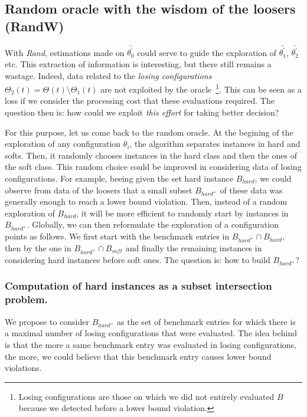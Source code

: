 \documentclass[10pt, conference, compsocconf]{IEEEtran}
\begin{document}
\subsection{Random  oracle with the wisdom of the loosers (RandW)}

With {\it Rand}, estimations made on  $\bar{\theta^{'}_0}$ could serve 
to guide the exploration of $\bar{\theta^{'}_{1}}$, $\bar{\theta^{'}_{2}}$ etc. This extraction of information is 
interesting, but there still remains a wastage. Indeed, data related to the {\it losing configurations} 
$\Theta_2(t) = \Theta(t) \setminus \Theta_1(t)$ are not exploited by the oracle~\footnote{Losing configurations 
are those on which we did not entirely evaluated $B$ because we detected before a lower bound violation.}. 
This can be seen as a loss if we consider the processing cost that these evaluations required. The question then 
is: how could we exploit {\it this effort} for taking better decision? 

For this purpose, let us come back to the random  oracle. At the begining of the exploration of any 
configuration $\theta_i$, the algorithm separates instances in hard and softs. Then, it randomly chooses  
instances in the hard class and then the ones of the soft class. This random choice could be improved 
in considering data of losing configurations. For example, beeing given the set hard instance $B_{hard}$,  
we could observe from data of the loosers that a small subset $B_{hard^+}$ of these data was generally 
enough to reach a lower bound violation. Then, instead of a random exploration of $B_{hard}$, 
it will be more efficient to randomly start by instances in $B_{hard^+}$. 
Globally, we can then reformulate the exploration of a configuration points as follows. We first start with the benchmark 
entries in  $B_{hard^+} \cap B_{hard}$, then by the one in $B_{hard^+} \cap B_{soft}$ and finally the remaining 
instances in considering hard instances before soft ones. The question is: how to build $B_{hard^+}$? 


\subsubsection{Computation of hard instances as a subset intersection problem.} 

We propose to consider $B_{hard^+}$  as the set of benchmark entries for which there is 
a maximal number of losing configurations that were evaluated. The idea behind is that 
the more a same benchmark entry was evaluated in losing configurations, the more, we 
could believe that this benchmark entry causes lower bound violations. 
\end{document}
